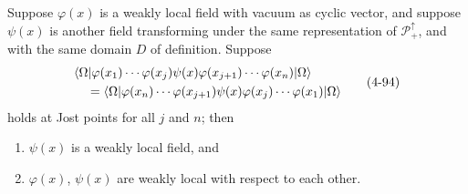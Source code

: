 \begin{theorem}[4-18]\label{thm:ch4-18-weak-local-relative}
Suppose $\varphi(x)$ is a weakly local field with vacuum as cyclic vector, and
suppose $\psi(x)$ is another field transforming under the same representation
of $\mathcal P_+^\uparrow$, and with the same domain $D$ of definition.
Suppose
\begin{equation}
\begin{aligned}
 &\langle \Omega\rvert\varphi(x_1)\cdots\varphi(x_j)\psi(x)
   \varphi(x_{j+1})\cdots\varphi(x_n)\lvert \Omega\rangle\\
 &\quad =
   \langle \Omega\rvert\varphi(x_n)\cdots\varphi(x_{j+1})\psi(x)
   \varphi(x_j)\cdots\varphi(x_1)\lvert \Omega\rangle
\end{aligned}
\tag{4-94}\label{eq:ch4-wlc-interchange}
\end{equation}
holds at Jost points for all $j$ and $n$; then
\begin{enumerate}
\item[(a)] $\psi(x)$ is a weakly local field, and
\item[(b)] $\varphi(x)$, $\psi(x)$ are weakly local with respect to each other.
\end{enumerate}
\end{theorem}

